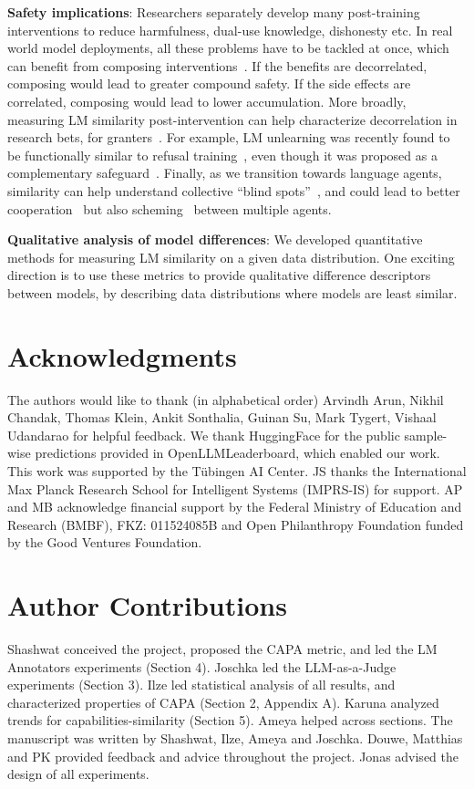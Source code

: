 \textbf{Safety implications}: Researchers separately develop many post-training interventions to reduce harmfulness, dual-use knowledge, dishonesty etc. In real world model deployments, all these problems have to be tackled at once, which can benefit from composing interventions~\citep{kolbeinsson2024composableinterventionslanguagemodels}. If the benefits are decorrelated, composing would lead to greater compound safety. If the side effects are correlated, composing would lead to lower accumulation. More broadly, measuring LM similarity post-intervention can help characterize decorrelation in research bets, for granters~\citep{CANTON2025105129}. For example, LM unlearning was recently found to be functionally similar to refusal training~\citep{lucki2024adversarialperspectivemachineunlearning}, even though it was proposed as a complementary safeguard~\citep{li2024wmdp}. Finally, as we transition towards language agents, similarity can help understand collective ``blind spots''~\citep{he-etal-2023-blind}, and could lead to better cooperation~\citep{lowe2017multi} but also scheming~\citep{balesni2024evaluationsbasedsafetycasesai} between multiple agents. 
    
\textbf{Qualitative analysis of model differences}: We developed quantitative methods for measuring LM similarity on a given data distribution. One exciting direction is to use these metrics to provide qualitative difference descriptors~\citep{dunlap2024vibecheckdiscoverquantifyqualitative} between models, by describing data distributions where models are least similar.  

\section*{Acknowledgments} The authors would like to thank (in alphabetical order) Arvindh Arun, Nikhil Chandak, Thomas Klein, Ankit Sonthalia, Guinan Su, Mark Tygert, Vishaal Udandarao for helpful feedback. We thank HuggingFace for the public sample-wise predictions provided in OpenLLMLeaderboard, which enabled our work. This work was supported by the Tübingen AI Center. JS thanks the International Max Planck Research School for Intelligent Systems (IMPRS-IS) for support. AP and MB acknowledge financial support by the Federal Ministry of Education and Research (BMBF), FKZ: 011524085B and Open Philanthropy Foundation funded by the Good Ventures Foundation. 



\section*{Author Contributions} Shashwat conceived the project, proposed the CAPA metric, and led the LM Annotators experiments (Section 4). Joschka led the LLM-as-a-Judge experiments (Section 3). Ilze led statistical analysis of all results, and characterized properties of CAPA (Section 2, Appendix A). Karuna analyzed trends for capabilities-similarity (Section 5). Ameya helped across sections. The manuscript was written by Shashwat, Ilze, Ameya and Joschka. Douwe, Matthias and PK provided feedback and advice throughout the project. Jonas advised the design of all experiments. 